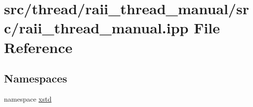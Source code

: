 \hypertarget{raii__thread__manual_8ipp}{\section{src/thread/raii\-\_\-thread\-\_\-manual/src/raii\-\_\-thread\-\_\-manual.ipp File Reference}
\label{raii__thread__manual_8ipp}
}
\subsection*{Namespaces}
\begin{DoxyCompactItemize}
\item 
namespace \hyperlink{namespacexstd}{xstd}
\end{DoxyCompactItemize}
